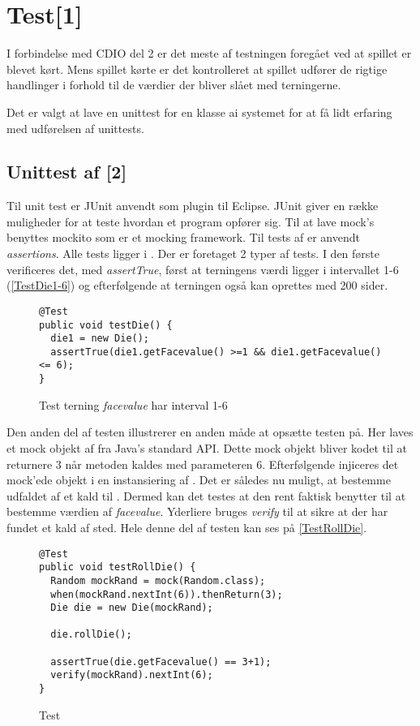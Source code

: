 \chapter{Test[1]}\label{chap:test}
I forbindelse med CDIO del 2 er det meste af testningen foregået ved at spillet er blevet kørt. Mens spillet kørte er det kontrolleret at spillet udfører de rigtige handlinger i forhold til de værdier der bliver slået med terningerne.

Det er valgt at lave en unittest for en klasse ai systemet for at få lidt erfaring med udførelsen af unittests.

\section{Unittest af [2]}\label{sec:test:unitTestDie}
Til unit test er JUnit anvendt som plugin til Eclipse. JUnit giver en række muligheder for at teste hvordan et program opfører sig. Til at lave mock's benyttes mockito som er et mocking framework. Til tests af  er anvendt \textit{assertions}. Alle tests ligger i . Der er foretaget 2 typer af tests. I den første verificeres det, med \textit{assertTrue}, først at terningens værdi ligger i intervallet 1-6 (\vref{TestDie1-6}) og efterfølgende at terningen også kan oprettes med 200 sider. 

\begin{figure}
\caption{Test terning \textit{facevalue} har interval 1-6}
\label{TestDie1-6}
\begin{lstlisting}
@Test
public void testDie() {
  die1 = new Die();
  assertTrue(die1.getFacevalue() >=1 && die1.getFacevalue() <= 6);
}
\end{lstlisting}
\end{figure}   

Den anden del af testen illustrerer en anden måde at opsætte testen på. Her laves et mock objekt af  fra Java's standard API. Dette mock objekt bliver kodet til at returnere 3 når metoden  kaldes med parameteren 6. Efterfølgende injiceres det mock'ede objekt i en instansiering af . Det er således nu muligt, at bestemme udfaldet af et kald til . Dermed kan det testes at den  rent faktisk benytter  til at bestemme værdien af \textit{facevalue}. Yderliere bruges \textit{verify} til at sikre at der har fundet et kald af  sted. Hele denne del af testen kan ses på \vref{TestRollDie}.

\begin{figure}
\caption{Test }
\label{TestRollDie}
\begin{lstlisting}
@Test
public void testRollDie() {
  Random mockRand = mock(Random.class);
  when(mockRand.nextInt(6)).thenReturn(3);
  Die die = new Die(mockRand); 

  die.rollDie();

  assertTrue(die.getFacevalue() == 3+1);
  verify(mockRand).nextInt(6);
}
\end{lstlisting}
\end{figure}     